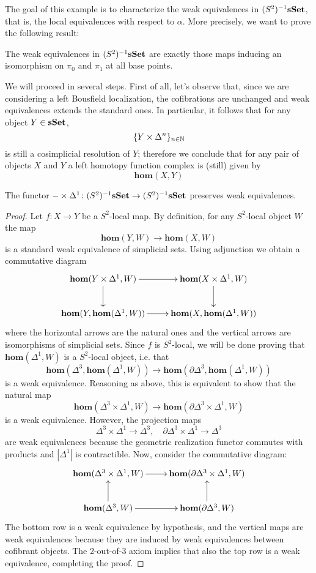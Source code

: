 The goal of this example is to characterize the weak equivalences in $(S^2)^{-1} \mathbf{sSet}$, that is, the local equivalences with respect to $\alpha$. More precisely, we want to prove the following result:

\begin{prop} \label{prop S^2 nullification}
The weak equivalences in $(S^2)^{-1} \mathbf{sSet}$ are exactly those maps inducing an isomorphism on $\pi_0$ and $\pi_1$ at all base points.
\end{prop}

We will proceed in several steps. First of all, let's observe that, since we are considering a left Bousfield localization, the cofibrations are unchanged and weak equivalences extends the standard ones. In particular, it follows that for any object $Y \in \mathbf{sSet}$,
\[
\{Y \times \Delta^n\}_{n \in \mathbb{N}}
\]
is still a cosimplicial resolution of $Y$; therefore we conclude that for any pair of objects $X$ and $Y$ a left homotopy function complex is (still) given by
\[
\mathbf{hom}(X,Y)
\]

\begin{lemma} \label{lemma S^2 nullification 1}
The functor $- \times \Delta^1 \colon (S^2)^{-1} \mathbf{sSet} \to (S^2)^{-1} \mathbf{sSet}$ preserves weak equivalences.
\end{lemma}

\begin{proof}
Let $f \colon X \to Y$ be a $S^2$-local map. By definition, for any $S^2$-local object $W$ the map
\[
\mathbf{hom}(Y,W) \to \mathbf{hom}(X,W)
\]
is a standard weak equivalence of simplicial sets. Using adjunction we obtain a commutative diagram
\[
\xymatrix{
\mathbf{hom}(Y \times \Delta^1, W) \ar[d] \ar[r] & \mathbf{hom}(X \times \Delta^1, W) \ar[d] \\ \mathbf{hom}(Y, \mathbf{hom}(\Delta^1, W)) \ar[r] & \mathbf{hom}(X, \mathbf{hom}(\Delta^1,W))
}
\]
where the horizontal arrows are the natural ones and the vertical arrows are isomorphisms of simplicial sets. Since $f$ is $S^2$-local, we will be done proving that $\mathbf{hom}(\Delta^1,W)$ is a $S^2$-local object, i.e. that
\[
\mathbf{hom}(\Delta^3, \mathbf{hom}(\Delta^1, W)) \to \mathbf{hom}(\partial \Delta^3, \mathbf{hom}(\Delta^1, W))
\]
is a weak equivalence. Reasoning as above, this is equivalent to show that the natural map
\[
\mathbf{hom}(\Delta^3 \times \Delta^1, W) \to \mathbf{hom}(\partial \Delta^3 \times \Delta^1, W)
\]
is a weak equivalence. However, the projection maps
\[
\Delta^3 \times \Delta^1 \to \Delta^3, \quad \partial \Delta^3 \times \Delta^1 \to \Delta^3
\]
are weak equivalences because the geometric realization functor commutes with products and $|\Delta^1|$ is contractible. Now, consider the commutative diagram:
\[
\xymatrix{
\mathbf{hom}(\Delta^3 \times \Delta^1, W) \ar[r] & \mathbf{hom}(\partial \Delta^3 \times \Delta^1, W) \\ \mathbf{hom}(\Delta^3, W) \ar[u] \ar[r] & \mathbf{hom}(\partial \Delta^3, W) \ar[u]
}
\]
The bottom row is a weak equivalence by hypothesis, and the vertical maps are weak equivalences because they are induced by weak equivalences between cofibrant objects. The 2-out-of-3 axiom implies that also the top row is a weak equivalence, completing the proof.
\end{proof}

